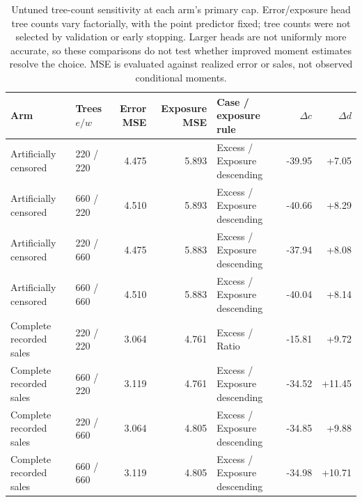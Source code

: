 \begin{table}[t]\centering\scriptsize
\caption{Untuned tree-count sensitivity at each arm's primary cap. Error/exposure head tree counts vary factorially, with the point predictor fixed; tree counts were not selected by validation or early stopping. Larger heads are not uniformly more accurate, so these comparisons do not test whether improved moment estimates resolve the choice. MSE is evaluated against realized error or sales, not observed conditional moments.}\label{tab:matched-heads}
\begin{tabular}{llrrlrr}\toprule
Arm & Trees $e/w$ & Error MSE & Exposure MSE & Case / exposure rule & $\Delta c$ & $\Delta d$\\\midrule
Artificially censored & 220 / 220 & 4.475 & 5.893 & Excess / Exposure descending & -39.95 & +7.05 \\
Artificially censored & 660 / 220 & 4.510 & 5.893 & Excess / Exposure descending & -40.66 & +8.29 \\
Artificially censored & 220 / 660 & 4.475 & 5.883 & Excess / Exposure descending & -37.94 & +8.08 \\
Artificially censored & 660 / 660 & 4.510 & 5.883 & Excess / Exposure descending & -40.04 & +8.14 \\
Complete recorded sales & 220 / 220 & 3.064 & 4.761 & Excess / Ratio & -15.81 & +9.72 \\
Complete recorded sales & 660 / 220 & 3.119 & 4.761 & Excess / Exposure descending & -34.52 & +11.45 \\
Complete recorded sales & 220 / 660 & 3.064 & 4.805 & Excess / Exposure descending & -34.85 & +9.88 \\
Complete recorded sales & 660 / 660 & 3.119 & 4.805 & Excess / Exposure descending & -34.98 & +10.71 \\\bottomrule\end{tabular}\end{table}
